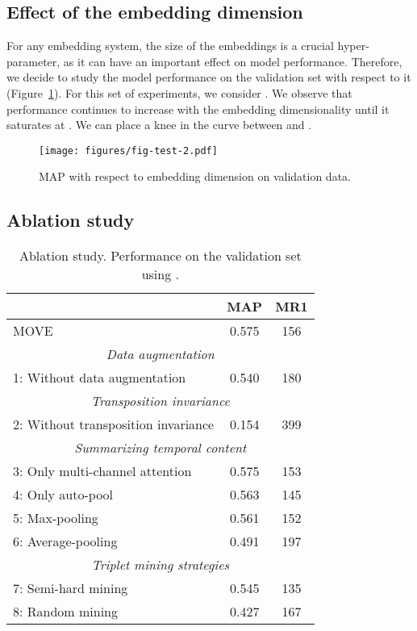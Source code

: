 \documentclass[letterpaper]{article}
\newcommand{\modelname}{MOVE}
\newcommand{\tabspace}{\vspace{-5mm}}
\begin{document}
\subsection{Effect of the embedding dimension}

For any embedding system, the size of the embeddings  is a crucial hyper-parameter, as it can have an important effect on model performance. Therefore, we decide to study the model performance on the validation set with respect to it (Figure~\ref{fig:embmap}). For this set of experiments, we consider . We observe that performance continues to increase with the embedding dimensionality until it saturates at . We can place a knee in the curve between  and .

\begin{figure}[tb!]
  \centering
  \texttt{[image: figures/fig-test-2.pdf]}
  \vspace{-7mm}
  \caption{MAP with respect to embedding dimension  on validation data.}
  \label{fig:embmap}
  \vspace{-2mm}
\end{figure}
\vspace{-2mm}

\subsection{Ablation study}

\begin{table}[tb!]
\setlength\tabcolsep{10pt}
\begin{center}
\label{tab:ablation}
\begin{tabular}{l c c}
\hline\hline
 & MAP &  MR1 \\
\hline\hline

\modelname & 0.575  &  156  \\ 

\hline \multicolumn{3}{c}{\textit{Data augmentation}} \\ 
1: Without data augmentation & 0.540   &  180  \\ \hline \multicolumn{3}{c}{\textit{Transposition invariance}} \\ 
2: Without transposition invariance &    0.154 & 399 \\ \hline \multicolumn{3}{c}{\textit{Summarizing temporal content}} \\ 
3: Only multi-channel attention &  0.575 &  153  \\ 4: Only auto-pool &  0.563  & 145   \\ 5: Max-pooling & 0.561  &  152 \\ 6: Average-pooling & 0.491  &  197 \\ \hline \multicolumn{3}{c}{\textit{Triplet mining strategies}} \\
7: Semi-hard mining & 0.545  & 135 \\ 8: Random mining & 0.427  & 167 \\ 

\hline\hline
\end{tabular}
\caption{Ablation study. Performance on the validation set using .}\label{tab:ablation}
\end{center}
\tabspace
\end{table}
\end{document}
